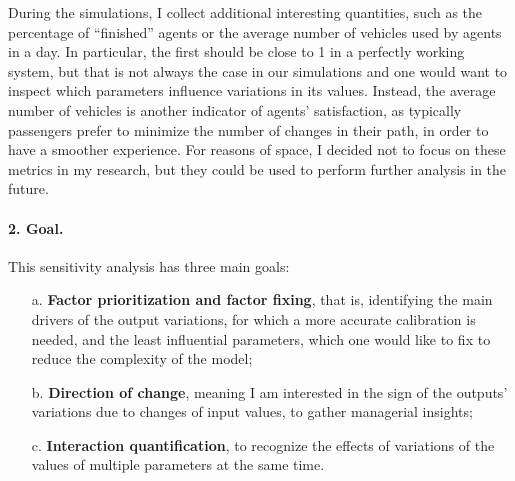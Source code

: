 During the simulations, I collect additional interesting quantities, such as the percentage of “finished” agents or the average number of vehicles used by agents in a day. In particular, the first should be close to 1 in a perfectly working system, but that is not always the case in our simulations and one would want to inspect which parameters influence variations in its values. Instead, the average number of vehicles is another indicator of agents' satisfaction, as typically passengers prefer to minimize the number of changes in their path, in order to have a smoother experience. For reasons of space, I decided not to focus on these metrics in my research, but they could be used to perform further analysis in the future.


\paragraph{2. Goal.}
This sensitivity analysis has three main goals:
\begin{enumerate}
    \item[a.] \textbf{Factor prioritization and factor fixing}, that is, identifying the main drivers of the output variations, for which a more accurate calibration is needed, and the least influential parameters, which one would like to fix to reduce the complexity of the model;
    \item[b.] \textbf{Direction of change}, meaning I am interested in the sign of the outputs' variations due to changes of input values, to gather managerial insights;
    \item[c.] \textbf{Interaction quantification}, to recognize the effects of variations of the values of multiple parameters at the same time. 
\end{enumerate}


